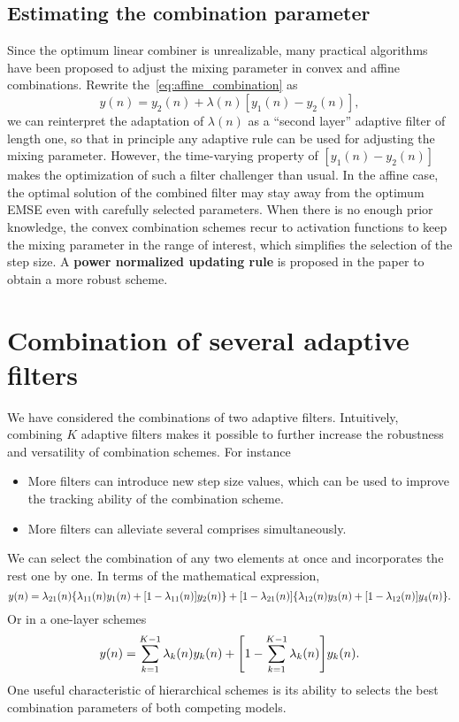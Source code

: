 \documentclass[11pt]{article}
\begin{document}
\subsection{Estimating the combination parameter}\label{sec:estimating}
Since the optimum linear combiner is unrealizable, many practical algorithms have been proposed to adjust the mixing parameter in convex and affine combinations. Rewrite the~\cref{eq:affine_combination} as
\begin{equation}
    y(n) = y_2(n)+\lambda(n)[y_1(n)-y_2(n)],
\end{equation}
we can reinterpret the adaptation of $\lambda(n)$ as a ``second layer'' adaptive filter of length one, so that in principle any adaptive rule can be used for adjusting the mixing parameter. However, the time-varying property of $[y_1(n)-y_2(n)]$ makes the optimization of such a filter challenger than usual. In the affine case, the optimal solution of the combined filter may stay away from the optimum EMSE even with carefully selected parameters. When there is no enough prior knowledge, the convex combination schemes recur to activation functions to keep the mixing parameter in the range of interest, which simplifies the selection of the step size. A \textbf{power normalized updating rule} is proposed in the paper to obtain a more robust scheme.

\section{Combination of several adaptive filters}
We have considered the combinations of two adaptive filters. Intuitively, combining $K$ adaptive filters makes it possible to further increase the robustness and versatility of combination schemes. For instance
\begin{itemize}
    \item More filters can introduce new step size values, which can be used to improve the tracking ability of the combination scheme.
    \item More filters can alleviate several comprises simultaneously. 
\end{itemize}

We can select the combination of any two elements at once and incorporates the rest one by one. In terms of the mathematical expression,
\begin{equation}
    y(n) =\lambda_{21}(n)\braces*{\lambda_{11}(n)y_1(n)+\bracks*{1-\lambda_{11}(n)}y_2(n)}+\bracks*{1-\lambda_{21}(n)}\braces*{\lambda_{12}(n)y_3(n)+\bracks*{1-\lambda_{12}(n)}y_4(n)}.
\end{equation}
Or in a one-layer schemes
\begin{equation}
    y(n)=\sum_{k=1}^{K-1}\lambda_k(n)y_k(n)+\bracks*{1-\sum_{k=1}^{K-1}\lambda_k(n)}y_k(n).
\end{equation}
One useful characteristic of hierarchical schemes is its ability to selects the best combination parameters of both competing models.
\end{document}

